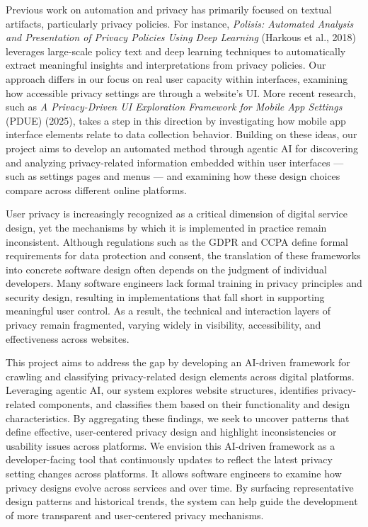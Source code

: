 \documentclass[12pt,letterpaper]{article}
\begin{document}
    Previous work on automation and privacy has primarily focused on textual artifacts, particularly privacy policies. For instance, \textit{Polisis: Automated Analysis and Presentation of Privacy Policies Using Deep Learning} (Harkous et al., 2018) leverages large-scale policy text and deep learning techniques to automatically extract meaningful insights and interpretations from privacy policies. Our approach differs in our focus on real user capacity within interfaces, examining how accessible privacy settings are through a website’s UI. More recent research, such as \textit{A Privacy-Driven UI Exploration Framework for Mobile App Settings} (PDUE) (2025), takes a step in this direction by investigating how mobile app interface elements relate to data collection behavior. Building on these ideas, our project aims to develop an automated method through agentic AI for discovering and analyzing privacy-related information embedded within user interfaces — such as settings pages and menus — and examining how these design choices compare across different online platforms.
    
    User privacy is increasingly recognized as a critical dimension of digital service design, yet the mechanisms by which it is implemented in practice remain inconsistent. Although regulations such as the GDPR and CCPA define formal requirements for data protection and consent, the translation of these frameworks into concrete software design often depends on the judgment of individual developers. Many software engineers lack formal training in privacy principles and security design, resulting in implementations that fall short in supporting meaningful user control. As a result, the technical and interaction layers of privacy remain fragmented, varying widely in visibility, accessibility, and effectiveness across websites.
    
    This project aims to address the gap by developing an AI-driven framework for crawling and classifying privacy-related design elements across digital platforms. Leveraging agentic AI, our system explores website structures, identifies privacy-related components, and classifies them based on their functionality and design characteristics. By aggregating these findings, we seek to uncover patterns that define effective, user-centered privacy design and highlight inconsistencies or usability issues across platforms. We envision this AI-driven framework as a developer-facing tool that continuously updates to reflect the latest privacy setting changes across platforms. It allows software engineers to examine how privacy designs evolve across services and over time. By surfacing representative design patterns and historical trends, the system can help guide the development of more transparent and user-centered privacy mechanisms.
    
\end{document}

